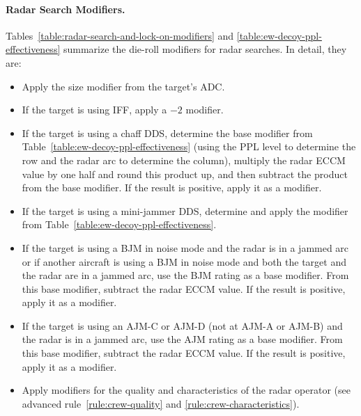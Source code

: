 {\paragraph{Radar Search Modifiers.} Tables~\ref{table:radar-search-and-lock-on-modifiers} and \ref{table:ew-decoy-ppl-effectiveness} summarize the die-roll modifiers for radar searches. In detail, they are:
\begin{itemize}
    \item Apply the size modifier from the target’s ADC.
    \item If the target is using IFF, apply a $-2$ modifier.
    \item If the target is using a chaff DDS, determine the base modifier from Table~\ref{table:ew-decoy-ppl-effectiveness} (using the PPL level to determine the row and the radar arc to determine the column), multiply the radar ECCM value by one half and round this product up, and then subtract the product from the base modifier. If the result is positive, apply it as a modifier.
    \item If the target is using a mini-jammer DDS, determine and apply the modifier from Table~\ref{table:ew-decoy-ppl-effectiveness}.
    \item If the target is using a BJM in noise mode and the radar is in a jammed arc or if another aircraft is using a BJM in noise mode and both the target and the radar are in a jammed arc, use the BJM rating as a base modifier. From this base modifier, subtract the radar ECCM value. If the result is positive, apply it as a modifier.
    \item If the target is using an AJM-C or AJM-D (not at AJM-A or AJM-B) and the radar is in a jammed arc, use the AJM rating as a base modifier. From this base modifier, subtract the radar ECCM value. If the result is positive, apply it as a modifier.
    \item Apply modifiers for the quality and characteristics of the radar operator (see advanced rule~\ref{rule:crew-quality} and \ref{rule:crew-characteristics}). 
\end{itemize}



}

